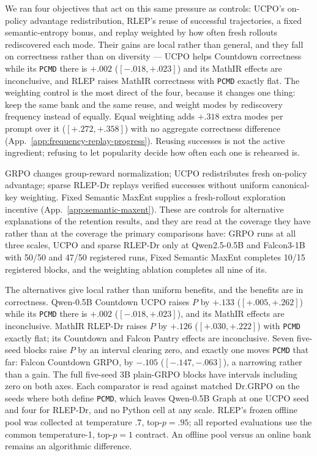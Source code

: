 \documentclass{article}
\newcommand{\1}{\mathbf 1}
\newcommand{\pmd}{\texttt{PCMD}}
\theoremstyle{remark}
\theoremstyle{definition}
\theoremstyle{plain}
\begin{document}
We ran four objectives that act on this same pressure as controls: UCPO's
on-policy advantage redistribution, RLEP's reuse of successful trajectories, a
fixed semantic-entropy bonus, and replay weighted by how often fresh rollouts
rediscovered each mode. Their gains are local rather than general, and they fall on
correctness rather than on diversity --- UCPO helps Countdown correctness while
its \pmd{} there is $+.002$ ($[-.018,+.023]$) and its MathIR effects are
inconclusive, and RLEP raises MathIR correctness with \pmd{} exactly flat. The weighting control is the most direct of the four, because it
changes one thing: keep the same bank and the same reuse, and weight modes by
rediscovery frequency instead of equally. Equal weighting adds $+.318$ extra
modes per prompt over it ($[+.272,+.358]$) with no aggregate correctness
difference (App.~\ref{app:frequency-replay-progress}). Reusing successes is not
the active ingredient; refusing to let popularity decide how often each one is
rehearsed is.

GRPO changes group-reward normalization; UCPO redistributes fresh on-policy
advantage; sparse RLEP-Dr replays verified successes without uniform
canonical-key weighting. Fixed Semantic MaxEnt supplies a fresh-rollout
exploration incentive (App.~\ref{app:semantic-maxent}). These are
controls for alternative explanations of the retention results, and they
are read at the coverage they have rather than at the coverage the primary
comparisons have: GRPO runs at all three scales, UCPO and sparse RLEP-Dr
only at Qwen2.5-0.5B and Falcon3-1B with 50/50 and 47/50 registered runs,
Fixed Semantic MaxEnt completes 10/15 registered blocks, and the weighting
ablation completes all nine of its.


The alternatives give local rather than uniform benefits, and the
benefits are in correctness. Qwen-0.5B Countdown UCPO raises $P$ by $+.133$
($[+.005,+.262]$) while its \pmd{} there is $+.002$ ($[-.018,+.023]$), and its
MathIR effects are inconclusive. MathIR RLEP-Dr raises $P$ by $+.126$
($[+.030,+.222]$) with \pmd{} exactly flat; its Countdown and Falcon Pantry
effects are inconclusive. Seven five-seed blocks raise $P$ by an interval
clearing zero, and exactly one moves \pmd{} that far: Falcon Countdown GRPO,
by $-.105$ ($[-.147,-.063]$), a narrowing rather than a gain. The full
five-seed 3B plain-GRPO blocks have intervals including zero on both axes.
Each comparator is read against matched Dr.GRPO on the seeds where both define
\pmd{}, which leaves Qwen-0.5B Graph at one UCPO seed and four for RLEP-Dr,
and no Python cell at any scale.
RLEP's frozen offline pool was collected at temperature $.7$, top-$p=.95$;
all reported evaluations use the common temperature-1, top-$p=1$ contract.
An offline pool versus an online bank remains an algorithmic difference.
\end{document}
